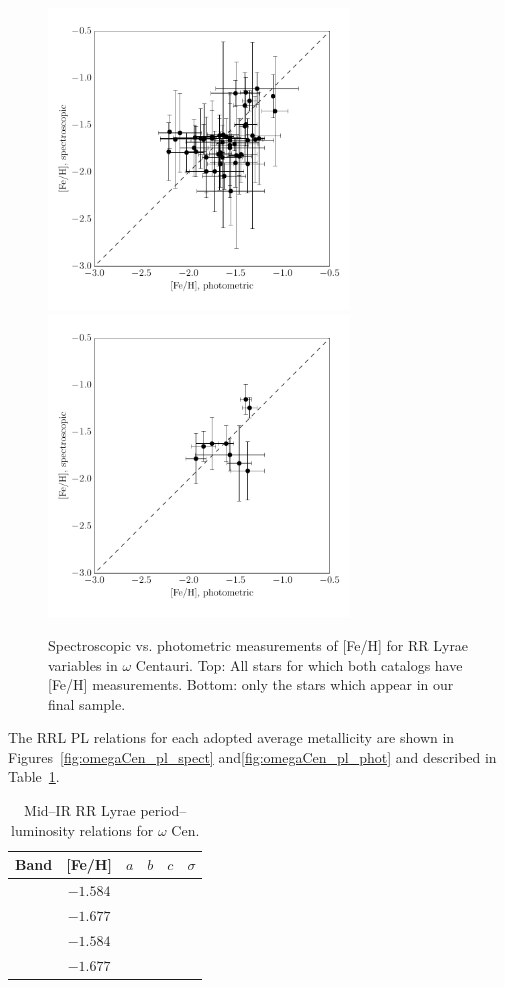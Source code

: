 \documentclass[a4paper,fleqn,usenatbib]{mnras}
\begin{document}
\begin{figure}
\begin{center}
\includegraphics[width=80mm]{final_plots/metallicity_comparison_all.pdf}
\includegraphics[width=80mm]{final_plots/metallicity_comparison_samestars.pdf}
\caption{Spectroscopic vs. photometric measurements of [Fe/H] for RR Lyrae variables in $\omega$ Centauri. Top: All stars for which both catalogs have [Fe/H] measurements. Bottom: only the stars which appear in our final sample.}
\label{fig:metallicity_comparison}
\end{center}
\end{figure}

The RRL PL relations for each adopted average metallicity are shown in Figures~\ref{fig:omegaCen_pl_spect} and\ref{fig:omegaCen_pl_phot} and described in Table~\ref{tab:pl_table}.

\begin{table}
\centering
\caption{Mid--IR RR Lyrae period--luminosity relations for $\omega$ Cen.} 
\label{tab:pl_table}
\begin{tabular}{lccccr} 
\hline \hline
Band & [Fe/H] & $a$ & $b$ & $c$ & $\sigma$\\
\hline
[3.6] & $-1.584$ & & & & \\
	& $-1.677$ & & & & \\
[4.5] & $-1.584$ & & & & \\         
	& $-1.677$ & & & & \\
\hline
\end{tabular}
\end{table}
\end{document}
